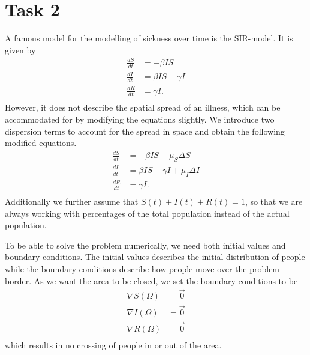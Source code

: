 \section{Task 2}

A famous model for the modelling of sickness over time is the SIR-model. It is given by
\begin{equation}
    \begin{split}
        \frac{dS}{dt} &= -\beta I S \\
        \frac{dI}{dt} &= \beta IS - \gamma I \\
        \frac{dR}{dt} &= \gamma I. \\
    \end{split}
\end{equation}
However, it does not describe the spatial spread of an illness, which can be accommodated for by modifying the equations slightly. We introduce
two dispersion terms to account for the spread in space and obtain the following modified equations.
\begin{equation}
    \begin{split}
        \frac{dS}{dt} &= -\beta I S + \mu_S \Delta S \\
        \frac{dI}{dt} &= \beta IS - \gamma I + \mu_I \Delta I\\
        \frac{dR}{dt} &= \gamma I. \\
    \end{split}
\end{equation}
Additionally we further assume that $S(t) + I(t) + R(t) = 1$, so that we are always working with percentages of the total population instead of the actual population.

To be able to solve the problem numerically, we need both initial values and boundary conditions. The initial values describes the initial distribution of people
while the boundary conditions describe how people move over the problem border. As we want the area to be closed, we set the boundary conditions to be
\begin{equation}
    \begin{split}
        \nabla S(\Omega) &= \Vec{0} \\
        \nabla I(\Omega) &= \Vec{0} \\
        \nabla R(\Omega) &= \Vec{0} \\
    \end{split}
\end{equation}
which results in no crossing of people in or out of the area.

